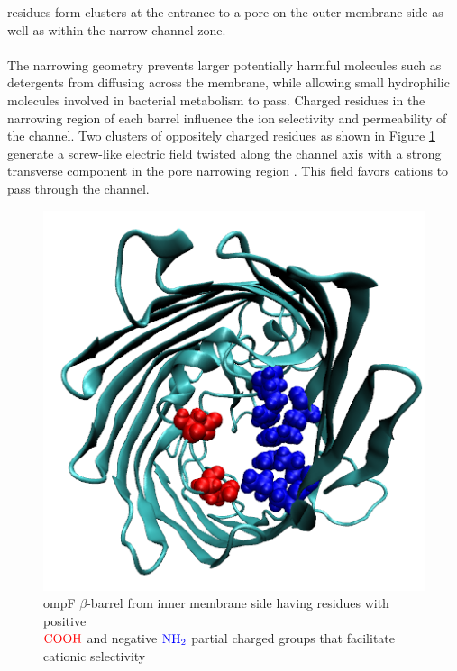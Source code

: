 \documentclass{article}[12pt]
\numberwithin{equation}{section}
\begin{document}
residues form clusters at the entrance to a pore on the outer membrane side as
well as within the narrow channel zone.
\\\\
The narrowing geometry prevents larger potentially harmful molecules such as
detergents from diffusing across the membrane, while allowing small hydrophilic
molecules involved in bacterial metabolism to pass. Charged residues in the
narrowing region of each barrel influence the ion selectivity and permeability
of the channel. Two clusters of oppositely charged residues as shown in Figure
\ref{fig:ompF-charges} generate a screw-like electric field twisted along the
channel axis with a strong transverse component in the pore narrowing region
\cite{Novikova2009}. This field favors cations to pass through the channel.
\begin{figure}[H]
	\centering{}
	\captionsetup{justification=centering}
	\includegraphics[scale=0.5]{ompf-charges}
\caption{ompF $\beta$-barrel from inner membrane side having residues with
positive \\ $\color{red}{\mathrm{COOH}}$ and negative $\color{blue}{\mathrm{NH_2}}$ partial
charged groups that facilitate cationic selectivity}
\label{fig:ompF-charges}
\end{figure}
\end{document}
